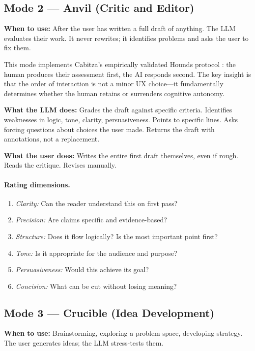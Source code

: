 \documentclass[11pt,a4paper]{article}
\begin{document}
\subsection{Mode 2 --- Anvil (Critic and Editor)}

\textbf{When to use:} After the user has written a full draft of anything. The
LLM evaluates their work. It never rewrites; it identifies problems and asks the
user to fix them.

This mode implements Cabitza's empirically validated Hounds protocol
\citep{cabitza2023rams}: the human produces their assessment first, the AI
responds second. The key insight is that the order of interaction is not a minor
UX choice---it fundamentally determines whether the human retains or surrenders
cognitive autonomy.

\textbf{What the LLM does:} Grades the draft against specific criteria.
Identifies weaknesses in logic, tone, clarity, persuasiveness. Points to specific
lines. Asks forcing questions about choices the user made. Returns the draft with
annotations, not a replacement.

\textbf{What the user does:} Writes the entire first draft themselves, even if
rough. Reads the critique. Revises manually.

\paragraph{Rating dimensions.}
\begin{enumerate}
    \item \emph{Clarity:} Can the reader understand this on first pass?
    \item \emph{Precision:} Are claims specific and evidence-based?
    \item \emph{Structure:} Does it flow logically? Is the most important point
    first?
    \item \emph{Tone:} Is it appropriate for the audience and purpose?
    \item \emph{Persuasiveness:} Would this achieve its goal?
    \item \emph{Concision:} What can be cut without losing meaning?
\end{enumerate}

\subsection{Mode 3 --- Crucible (Idea Development)}

\textbf{When to use:} Brainstorming, exploring a problem space, developing
strategy. The user generates ideas; the LLM stress-tests them.
\end{document}
